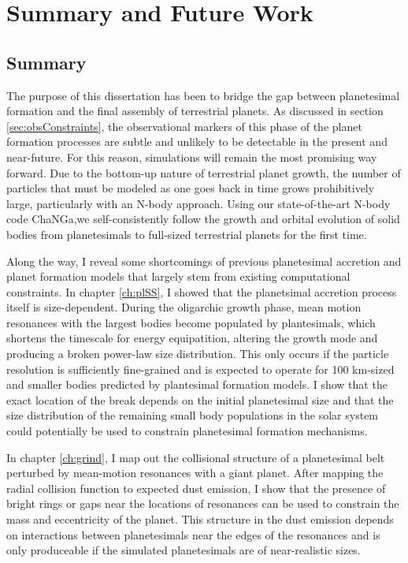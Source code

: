 \chapter {Summary and Future Work}

\section{Summary}
The purpose of this dissertation has been to bridge the gap between planetesimal formation and the final assembly of terrestrial planets. As discussed in section \ref{sec:obsConstraints}, the observational markers of this phase of the planet formation processes are subtle and unlikely to be detectable in the present and near-future. For this reason, simulations will remain the most promising way forward. Due to the bottom-up nature of terrestrial planet growth, the number of particles that must be modeled as one goes back in time grows prohibitively large, particularly with an N-body approach. Using our state-of-the-art N-body code {\sc ChaNGa},we self-consistently follow the growth and orbital evolution of solid bodies from planetesimals to full-sized terrestrial planets for the first time.

Along the way, I reveal some shortcomings of previous planetesimal accretion and planet formation models that largely stem from existing computational constraints. In chapter \ref{ch:plSS}, I showed that the planetsimal accretion process itself is size-dependent. During the oligarchic growth phase, mean motion resonances with the largest bodies become populated by plantesimals, which shortens the timescale for energy equipatition, altering the growth mode and producing a broken power-law size distribution. This only occurs if the particle resolution is sufficiently fine-grained and is expected to operate for 100 km-sized and smaller bodies predicted by plantesimal formation models. I show that the exact location of the break depends on the initial planetesimal size and that the size distribution of the remaining small body populations in the solar system could potentially be used to constrain planetesimal formation mechanisms.

In chapter \ref{ch:grind}, I map out the collisional structure of a planetesimal belt perturbed by mean-motion resonances with a giant planet. After mapping the radial collision function to expected dust emission, I show that the presence of bright rings or gaps near the locations of resonances can be used to constrain the mass and eccentricity of the planet. This structure in the dust emission depends on interactions between planetesimals near the edges of the resonances and is only produceable if the simulated planetesimals are of near-realistic sizes.

